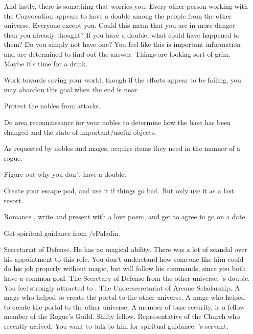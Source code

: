 \documentclass[char]{guildcamp3}
\begin{document}
And lastly, there is something that worries you. Every other person working with the Convocation appears to have a double among the people from the other universe. Everyone except you. Could this mean that you are in more danger than you already thought? If you have a double, what could have happened to them? Do you simply not have one? You feel like this is important information and are determined to find out the answer. Things are looking sort of grim. Maybe it's time for a drink.

\begin{itemz}[Goals]
		\item Work towards saving your world, though if the efforts appear to be failing, you may abandon this goal when the end is near.
		\item Protect the nobles from attacks.
		\item Do area reconnaissance for your nobles to determine how the base has been changed and the state of important/useful objects.
		\item As requested by nobles and mages, acquire items they need in the manner of a rogue.
		\item Figure out why you don't have a double.
		\item Create your escape pod, and use it if things go bad. But only use it as a last resort.
		\item Romance \cPoliOne{}, write and present \cPoliOne{\them} with a love poem, and get \cPoliOne{\them} to agree to go on a date.
		\item Get spiritual guidance from /cPaladin{}.
\end{itemz}


\begin{contacts}
		\contact{\cNobleOne{}} Secretariat of Defense. He has no magical ability. There was a lot of scandal over his appointment to this role. You don't understand how someone like him could do his job properly without magic, but will follow his commands, since you both have a common goal.
		\contact{\cPoliOne{}} The Secretary of Defense from the other universe, \cNobleOne{}'s double. You feel strongly attracted to \cPoliOne{\them}.
			\contact{\cNobleTwo{}} The Undersecretariat of Arcane Scholarship. 
			\contact{\cMageOne{}} A mage who helped to create the portal to the other universe.
			\contact{\cMageTwo{}} A mage who helped to create the portal to the other universe. 
			\contact{\cRogueTwo{}} A member of base security.  is a fellow member of the Rogue's Guild. Shifty fellow.
			\contact{\cPaladin{}} Representative of the Church who recently arrived. You want to talk to him for spiritual guidance.
			\contact{\cServant{}} \cNobleOne{}'s servant. 
\end{contacts}
\end{document}
